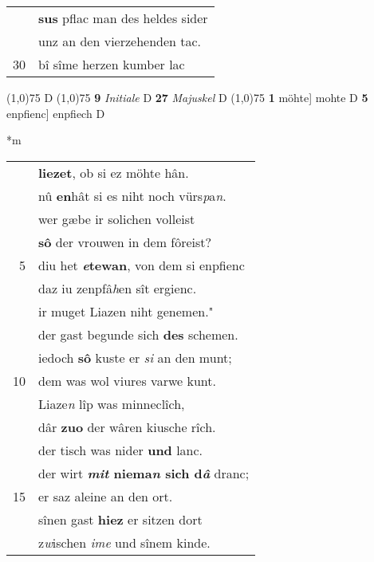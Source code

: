 \documentclass[8pt,a4paper,notitlepage]{article}
\begin{document}
\begin{table}[ht]
\begin{minipage}[t]{0.5\linewidth}
\begin{tabular}{rl}
 & \textbf{sus} pflac man des heldes sider\\ 
 & unz an den vierzehenden tac.\\ 
30 & bî sîme herzen kumber lac\\ 
\end{tabular}
\scriptsize
\line(1,0){75} \newline
D \newline
\line(1,0){75} \newline
\textbf{9} \textit{Initiale} D  \textbf{27} \textit{Majuskel} D  \newline
\line(1,0){75} \newline
\textbf{1} möhte] mohte D \textbf{5} enpfienc] enpfiech D \newline
\end{minipage}
\hspace{0.5cm}
\begin{minipage}[t]{0.5\linewidth}
\small
\begin{center}*m
\end{center}
\begin{tabular}{rl}
 & \textbf{liezet}, ob si ez möhte hân.\\ 
 & nû \textbf{en}hât si es niht noch vürs\textit{p}a\textit{n}.\\ 
 & wer gæbe ir solichen volleist\\ 
 & \textbf{sô} der vrouwen in dem fôreist?\\ 
5 & diu het \textbf{\textit{e}tewan}, von dem si enpfienc\\ 
 & daz iu zenpfâ\textit{h}en sît ergienc.\\ 
 & ir muget Liazen niht genemen."\\ 
 & der gast begunde sich \textbf{des} schemen.\\ 
 & iedoch \textbf{sô} kuste er \textit{si} an den munt;\\ 
10 & dem was wol viures varwe kunt.\\ 
 & Liaze\textit{n} lîp was minneclîch,\\ 
 & dâr \textbf{zuo} der wâren kiusche rîch.\\ 
 & der tisch was nider \textbf{und} lanc.\\ 
 & der wirt \textbf{\textit{mit} niema\textit{n} sich d\textit{â}} dranc;\\ 
15 & er saz aleine an den ort.\\ 
 & sînen gast \textbf{hiez} er sitzen dort\\ 
 & z\textit{w}ischen \textit{ime} und sînem kinde.\\ 

\end{tabular}
\end{minipage}
\end{table}
\end{document}
